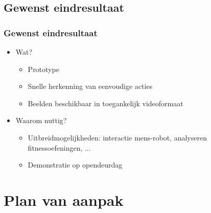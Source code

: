 \documentclass[]{beamer}
\begin{document}
	\subsection{Gewenst eindresultaat}	
	\begin{frame}
	\frametitle{Gewenst eindresultaat}
		\begin{itemize}
			\item<1- > Wat? 
				\begin{itemize}
				\item<1- > Prototype
				\item<1- > Snelle herkenning van eenvoudige acties
				\item<1- > Beelden beschikbaar in toegankelijk videoformaat
				\end{itemize}
			\item<2- > Waarom nuttig?
				\begin{itemize}
				\item<2- > Uitbreidmogelijkheden: interactie mens-robot, analyseren fitnessoefeningen, ...
				\item<2- > Demonstratie op opendeurdag
				\end{itemize}
			
		\end{itemize}
	\end{frame}

	\section{Plan van aanpak}
\end{document}

